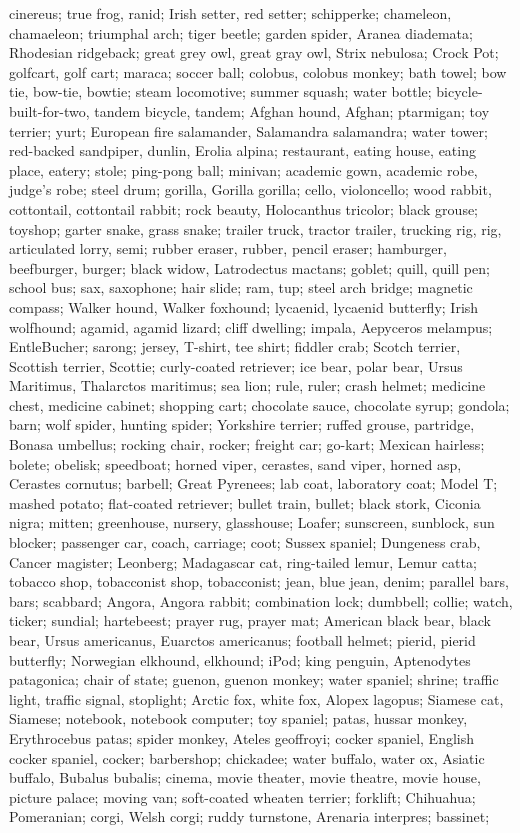 \documentclass[runningheads]{llncs}
\begin{document}
\begin{enumerate}
cinereus; true frog, ranid; Irish setter, red setter; schipperke; chameleon, chamaeleon; triumphal arch; tiger beetle; garden spider, Aranea diademata; Rhodesian ridgeback; great grey owl, great gray owl, Strix nebulosa; Crock Pot; golfcart, golf cart; maraca; soccer ball; colobus, colobus monkey; bath towel; bow tie, bow-tie, bowtie; steam locomotive; summer squash; water bottle; bicycle-built-for-two, tandem bicycle, tandem; Afghan hound, Afghan; ptarmigan; toy terrier; yurt; European fire salamander, Salamandra salamandra; water tower; red-backed sandpiper, dunlin, Erolia alpina; restaurant, eating house, eating place, eatery; stole; ping-pong ball; minivan; academic gown, academic robe, judge's robe; steel drum; gorilla, Gorilla gorilla; cello, violoncello; wood rabbit, cottontail, cottontail rabbit; rock beauty, Holocanthus tricolor; black grouse; toyshop; garter snake, grass snake; trailer truck, tractor trailer, trucking rig, rig, articulated lorry, semi; rubber eraser, rubber, pencil eraser; hamburger, beefburger, burger; black widow, Latrodectus mactans; goblet; quill, quill pen; school bus; sax, saxophone; hair slide; ram, tup; steel arch bridge; magnetic compass; Walker hound, Walker foxhound; lycaenid, lycaenid butterfly; Irish wolfhound; agamid, agamid lizard; cliff dwelling; impala, Aepyceros melampus; EntleBucher; sarong; jersey, T-shirt, tee shirt; fiddler crab; Scotch terrier, Scottish terrier, Scottie; curly-coated retriever; ice bear, polar bear, Ursus Maritimus, Thalarctos maritimus; sea lion; rule, ruler; crash helmet; medicine chest, medicine cabinet; shopping cart; chocolate sauce, chocolate syrup; gondola; barn; wolf spider, hunting spider; Yorkshire terrier; ruffed grouse, partridge, Bonasa umbellus; rocking chair, rocker; freight car; go-kart; Mexican hairless; bolete; obelisk; speedboat; horned viper, cerastes, sand viper, horned asp, Cerastes cornutus; barbell; Great Pyrenees; lab coat, laboratory coat; Model T; mashed potato; flat-coated retriever; bullet train, bullet; black stork, Ciconia nigra; mitten; greenhouse, nursery, glasshouse; Loafer; sunscreen, sunblock, sun blocker; passenger car, coach, carriage; coot; Sussex spaniel; Dungeness crab, Cancer magister; Leonberg; Madagascar cat, ring-tailed lemur, Lemur catta; tobacco shop, tobacconist shop, tobacconist; jean, blue jean, denim; parallel bars, bars; scabbard; Angora, Angora rabbit; combination lock; dumbbell; collie; watch, ticker; sundial; hartebeest; prayer rug, prayer mat; American black bear, black bear, Ursus americanus, Euarctos americanus; football helmet; pierid, pierid butterfly; Norwegian elkhound, elkhound; iPod; king penguin, Aptenodytes patagonica; chair of state; guenon, guenon monkey; water spaniel; shrine; traffic light, traffic signal, stoplight; Arctic fox, white fox, Alopex lagopus; Siamese cat, Siamese; notebook, notebook computer; toy spaniel; patas, hussar monkey, Erythrocebus patas; spider monkey, Ateles geoffroyi; cocker spaniel, English cocker spaniel, cocker; barbershop; chickadee; water buffalo, water ox, Asiatic buffalo, Bubalus bubalis; cinema, movie theater, movie theatre, movie house, picture palace; moving van; soft-coated wheaten terrier; forklift; Chihuahua; Pomeranian; corgi, Welsh corgi; ruddy turnstone, Arenaria interpres; bassinet; 
\end{enumerate}
\end{document}
